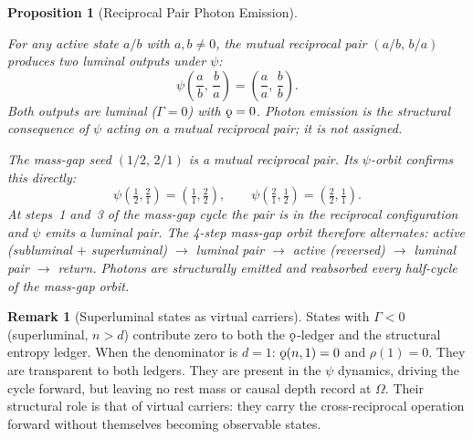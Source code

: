 \documentclass[11pt, letterpaper]{article}
\newcommand{\rank}{\rho}
\newcommand{\koppa}{\mathbin{\text{\rm\k{o}}}}
\newcommand{\Tcharge}{\Gamma}
\theoremstyle{definition}
\newtheorem{remark}{Remark}[section]
\theoremstyle{plain}
\newtheorem{proposition}{Proposition}[section]
\begin{document}
\begin{proposition}[Reciprocal Pair Photon Emission]\label{prop:reciprocal-photon}
\begin{rsbox}
For any active state $a/b$ with $a,b\neq 0$, the mutual reciprocal pair
$(a/b,\,b/a)$ produces two luminal outputs under $\psi$:
\[
\psi\!\left(\frac{a}{b},\,\frac{b}{a}\right) = \left(\frac{a}{a},\,\frac{b}{b}\right).
\]
Both outputs are luminal ($\Tcharge = 0$) with $\koppa = 0$.
Photon emission is the structural consequence of $\psi$ acting on a
mutual reciprocal pair; it is not assigned.

The mass-gap seed $(1/2,\,2/1)$ is a mutual reciprocal pair.  Its
$\psi$-orbit confirms this directly:
\[
\psi\!\left(\tfrac{1}{2},\tfrac{2}{1}\right) = \left(\tfrac{1}{1},\tfrac{2}{2}\right),
\qquad
\psi\!\left(\tfrac{2}{1},\tfrac{1}{2}\right) = \left(\tfrac{2}{2},\tfrac{1}{1}\right).
\]
At steps~1 and~3 of the mass-gap cycle the pair is in the reciprocal
configuration and $\psi$ emits a luminal pair.  The 4-step mass-gap orbit
therefore alternates: \emph{active} (subluminal $+$ superluminal) $\to$
\emph{luminal pair} $\to$ \emph{active} (reversed) $\to$ \emph{luminal
pair} $\to$ return.  Photons are structurally emitted and reabsorbed every
half-cycle of the mass-gap orbit.
\end{rsbox}
\end{proposition}

\begin{remark}[Superluminal states as virtual carriers]\label{rem:virtual-carriers}
States with $\Tcharge < 0$ (superluminal, $n > d$) contribute zero to both
the $\koppa$-ledger and the structural entropy ledger.  When the denominator
is $d=1$: $\koppa(n,1)=0$ and $\rank(1)=0$.  They are transparent to both
ledgers. They are present in the $\psi$ dynamics, driving the cycle forward, but
leaving no rest mass or causal depth record at $\Omega$.  Their structural
role is that of virtual carriers: they carry the cross-reciprocal operation
forward without themselves becoming observable states.
\end{remark}
\end{document}
